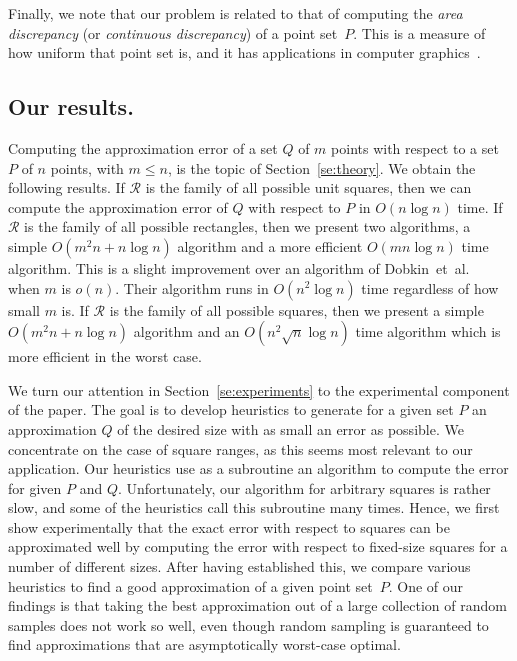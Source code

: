 \documentclass{elsart}
\newcommand{\ranges}{{\mathcal R}}
\begin{document}
Finally, we note that our problem is related to that of computing the
\emph{area discrepancy} (or \emph{continuous discrepancy}) of a point
set~$P$. This is a measure of how uniform that point set is, and it
has applications in computer graphics~\cite{dgm96,dem96,s-dqmsd-91}.


\subsection{Our results.}
Computing the approximation error of a set $Q$ of $m$ points with respect
to a set $P$ of $n$ points, with $m\leq n$,
is the topic of Section~\ref{se:theory}. We obtain the following results.
If $\ranges$ is the family of all possible unit squares, then we can
compute the approximation error of $Q$ with respect to $P$ in $O(n\log n)$
time. If $\ranges$
is the family of all possible rectangles, then we present two algorithms,
a simple $O(m^2n + n \log n)$ algorithm and a more efficient $O(mn\log
n)$ time algorithm.  This is a slight improvement over an algorithm
of Dobkin~et~al.~\cite{dgm96} when $m$ is $o(n)$. Their algorithm runs
in $O(n^2\log n)$ time regardless of how small $m$ is.  If $\ranges$ is
the family of all possible squares, then we present a simple $O(m^2n +
n \log n)$ algorithm and an $O(n^2\sqrt{n}\log n)$ time algorithm which
is more efficient in the worst case.

We turn our attention in Section~\ref{se:experiments} to
the experimental component of the paper. The goal is to develop
heuristics to generate for a given set $P$ an approximation $Q$ of the
desired size with as small an error as possible.  We concentrate on
the case of square ranges, as this seems most relevant to our
application.
Our heuristics use as a subroutine an algorithm to compute the error
for given $P$ and $Q$. Unfortunately, our algorithm for arbitrary
squares is rather slow, and some of the heuristics call this
subroutine many times.  Hence, we first show experimentally that the
exact error with respect to squares can be approximated well by
computing the error with respect to fixed-size squares for a number of
different sizes.  After having established this, we compare
various heuristics to find a good approximation of a given
point set~$P$. One of our findings is that taking the best
approximation out of a large collection of random samples does
not work so well, even though random sampling is guaranteed
to find approximations that are asymptotically worst-case optimal.
\end{document}
